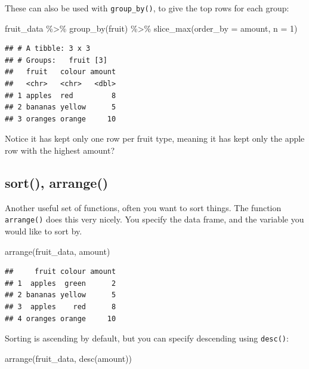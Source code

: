\documentclass[
]{book}
\newenvironment{Shaded}{\begin{snugshade}}{\end{snugshade}}
\newcommand{\AttributeTok}[1]{\textcolor[rgb]{0.77,0.63,0.00}{#1}}
\newcommand{\DecValTok}[1]{\textcolor[rgb]{0.00,0.00,0.81}{#1}}
\newcommand{\FunctionTok}[1]{\textcolor[rgb]{0.00,0.00,0.00}{#1}}
\newcommand{\NormalTok}[1]{#1}
\newcommand{\SpecialCharTok}[1]{\textcolor[rgb]{0.00,0.00,0.00}{#1}}
\begin{document}
These can also be used with \texttt{group\_by()}, to give the top rows for each group:

\begin{Shaded}
\begin{Highlighting}[]
\NormalTok{fruit\_data }\SpecialCharTok{\%\textgreater{}\%} \FunctionTok{group\_by}\NormalTok{(fruit) }\SpecialCharTok{\%\textgreater{}\%} \FunctionTok{slice\_max}\NormalTok{(}\AttributeTok{order\_by =}\NormalTok{ amount, }\AttributeTok{n  =}  \DecValTok{1}\NormalTok{)}
\end{Highlighting}
\end{Shaded}

\begin{verbatim}
## # A tibble: 3 x 3
## # Groups:   fruit [3]
##   fruit   colour amount
##   <chr>   <chr>   <dbl>
## 1 apples  red         8
## 2 bananas yellow      5
## 3 oranges orange     10
\end{verbatim}

Notice it has kept only one row per fruit type, meaning it has kept only the apple row with the highest amount?

\hypertarget{sort-arrange}{%
\subsection{sort(), arrange()}\label{sort-arrange}}

Another useful set of functions, often you want to sort things. The function \texttt{arrange()} does this very nicely. You specify the data frame, and the variable you would like to sort by.

\begin{Shaded}
\begin{Highlighting}[]
\FunctionTok{arrange}\NormalTok{(fruit\_data, amount)}
\end{Highlighting}
\end{Shaded}

\begin{verbatim}
##     fruit colour amount
## 1  apples  green      2
## 2 bananas yellow      5
## 3  apples    red      8
## 4 oranges orange     10
\end{verbatim}

Sorting is ascending by default, but you can specify descending using \texttt{desc()}:

\begin{Shaded}
\begin{Highlighting}[]
\FunctionTok{arrange}\NormalTok{(fruit\_data, }\FunctionTok{desc}\NormalTok{(amount))}
\end{Highlighting}
\end{Shaded}
\end{document}
